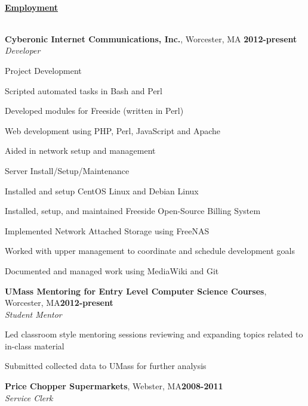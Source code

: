 \documentclass[10pt,notitlepage]{article}
\newenvironment{area}
	{
		\vspace{1em}
		\fontfamily{\sfdefault}\selectfont\begin{singlespace}
	}
	{\\\hrulefill\end{singlespace}\par}
\newcommand{\areaName}[1]{
	\noindent \uline{\hfill\phantom{.}}\\
	\uline{\phantom{.}\hfill{\Large\textbf{#1}}\hfill\phantom{.}}\\
}
\newcommand{\B}[1]{\textbf{#1}}
\newcommand{\I}[1]{\textit{#1}}
\begin{document}
\begin{area}
	\areaName{Employment}
\end{area}
\noindent \B{Cyberonic Internet Communications, Inc.}, Worcester, MA
\hfill\B{2012-present}\\
\I{Developer}
\begin{itemize*}
\item Project Development
\begin{itemize*}
	\item Scripted automated tasks in Bash and Perl
	\item Developed modules for Freeside (written in Perl)
	\item Web development using PHP, Perl, JavaScript and Apache
	\item Aided in network setup and management
\end{itemize*}
\item Server Install/Setup/Maintenance
\begin{itemize*}
	\item Installed and setup CentOS Linux and Debian Linux
	\item Installed, setup, and maintained Freeside Open-Source Billing System
	\item Implemented Network Attached Storage using FreeNAS
\end{itemize*}
\item Worked with upper management to coordinate and schedule development goals
\item Documented and managed work using MediaWiki and Git
\end{itemize*}
\vspace{1em}
\noindent \B{UMass Mentoring for Entry Level Computer Science Courses}, Worcester,
MA\hfill\B{2012-present}\\
\I{Student Mentor}
\begin{itemize*}
\item Led classroom style mentoring sessions reviewing and expanding topics related
to in-class material
\item Submitted collected data to UMass for further analysis
\end{itemize*}
\vspace{1em}
\noindent \B{Price Chopper Supermarkets}, Webster, MA\hfill\B{2008-2011}\\
\I{Service Clerk}
\end{document}
